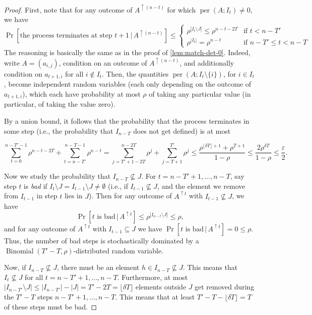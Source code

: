 \documentclass[10pt,reqno]{amsart}
\numberwithin{equation}{section}
\theoremstyle{remark}
\newcommand{\on}{\operatorname}
\begin{document}
\begin{proof}
First, note that for any outcome
of $A^{\uparrow (n-t)}$ for which $\on{per}(A;I_{t})\ne0$, we have
\[
\Pr[\text{the process terminates at step }t+1\,|\,A^{\uparrow (n-t)}]\le\begin{cases}
\rho^{|I_{t}\setminus J|}\le\rho^{n-t-2T} & \text{if }t<n-T'\\
\rho^{|I_{t}|}=\rho^{n-t}& \text{if }n-T'\le t< n-T
\end{cases}
\]
The reasoning is basically the same as in the proof of \cref{lem:match-det-0}. Indeed,
write $A=(a_{i,j})$, condition on an outcome of $A^{\uparrow (n-t)}$,
and additionally condition on $a_{t+1,i}$ for all $i\notin I_{t}$.
Then, the quantities $\on{per}(A;I_{t}\setminus\{i\})$, for
$i\in I_{t}$, become independent random variables (each only depending on the outcome of $a_{t+1,i}$), which each have
probability at most $\rho$ of taking any particular value (in particular,
of taking the value zero).

By a union bound, it follows that the probability that the process terminates in some step (i.e., the probability that $I_{n-T}$ does not get defined) is at most

\[
\sum_{t=0}^{n-T'-1}\rho^{n-t-2T}+\sum_{t=n-T'}^{n-T-1}\rho^{n-t}=\sum_{j=T'+1-2T}^{n-2T}\rho^{j}+\sum_{j=T+1}^{T'}\rho^{j}\le \frac{\rho^{\lfloor \delta T\rfloor+1}+\rho^{T+1}}{1-\rho}\le \frac{2\rho^{\delta T}}{1-\rho}\le\frac{\varepsilon}{2}.
\]

Now we study the probability that $I_{n-T}\nsubseteq J$. For $t= n-T'+1,\dots,n-T$, say step $t$ is \emph{bad} if $I_{t}\setminus J=I_{t-1}\setminus J\ne \emptyset$ (i.e., if $I_{t-1}\nsubseteq J$, and the element we remove from $I_{t-1}$ in step $t$ lies in $J$). Then for any outcome of $A^{\uparrow t}$ with $I_{t-1}\nsubseteq J$, we have
\[
\Pr[t\text{ is bad}\,|\,A^{\uparrow t}]\le\rho^{|I_{n-t}\setminus J|}\le\rho,
\]
and for any outcome of $A^{\uparrow t}$ with $I_{t-1}\subseteq J$ we have $\Pr[t\text{ is bad}\,|\,A^{\uparrow t}]=0\le \rho$. Thus, the number of bad steps is stochastically dominated by a $\on{Binomial}(T'-T,\rho)$-distributed random variable.

Now, if $I_{n-T}\not\subseteq J$, there must be an element $h\in I_{n-T}\not\subseteq J$. This means that $I_{t}\not\subseteq J$ for all $t= n-T'+1,\dots,n-T$. Furthermore, at most $|I_{n-T'}\setminus J|\le |I_{n-T'}|-|J|=T'-2T=\lfloor \delta T\rfloor$ elements outside $J$ get removed during the $T'-T$ steps $n-T'+1,\dots,n-T$. This means that at least $T'-T-\lfloor \delta T\rfloor=T$ of these steps must be bad.


\end{proof}
\end{document}
